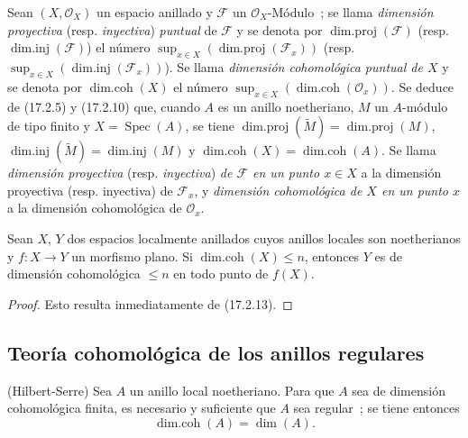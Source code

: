 \begin{env}[17.2.14]
\label{0.17.2.14-fr}
Sean $(X,\mathscr{O}_X)$ un espacio anillado y $\mathscr{F}$ un
$\mathscr{O}_X$-Módulo~; se llama \emph{dimensión proyectiva} (resp.
\emph{inyectiva}) \emph{puntual} de $\mathscr{F}$ y se denota por
$\operatorname{dim.proj}(\mathscr{F})$ (resp.
$\operatorname{dim.inj}(\mathscr{F})$) el número
$\sup_{x\in X}(\operatorname{dim.proj}(\mathscr{F}_x))$ (resp.
$\sup_{x\in X}(\operatorname{dim.inj}(\mathscr{F}_x))$). Se llama
\emph{dimensión cohomológica puntual de $X$} y se denota por
$\operatorname{dim.coh}(X)$ el número
$\sup_{x\in X}(\operatorname{dim.coh}(\mathscr{O}_x))$. Se deduce de
(17.2.5) y (17.2.10) que, cuando $A$ es un anillo noetheriano, $M$ un
$A$-módulo de tipo finito y $X=\operatorname{Spec}(A)$, se tiene
$\operatorname{dim.proj}(\widetilde{M})=\operatorname{dim.proj}(M)$,
$\operatorname{dim.inj}(\widetilde{M})=\operatorname{dim.inj}(M)$ y
$\operatorname{dim.coh}(X)=\operatorname{dim.coh}(A)$. Se llama
\emph{dimensión proyectiva} (resp. \emph{inyectiva}) \emph{de $\mathscr{F}$ en
un punto $x\in X$} a la dimensión proyectiva (resp. inyectiva) de
$\mathscr{F}_x$, y \emph{dimensión cohomológica de $X$ en un punto $x$} a la
dimensión cohomológica de $\mathscr{O}_x$.
\end{env}

\begin{proposition}[17.2.15]
\label{0.17.2.15-fr}
Sean $X$, $Y$ dos espacios localmente anillados cuyos anillos locales son noetherianos y
$f:X\longrightarrow Y$ un morfismo plano. Si
$\operatorname{dim.coh}(X)\leq n$, entonces $Y$ es de dimensión cohomológica
$\leq n$ en todo punto de $f(X)$.
\end{proposition}

\begin{proof}
Esto resulta inmediatamente de (17.2.13).
\end{proof}

\subsection{Teoría cohomológica de los anillos regulares}
\label{subsection:0.17.3-fr}

\begin{theorem}[17.3.1]
\label{0.17.3.1-fr}
\textnormal{(Hilbert-Serre)} Sea $A$ un anillo local noetheriano. Para que $A$
sea de dimensión cohomológica finita, es necesario y suficiente que $A$ sea
regular~; se tiene entonces
\begin{equation}
\label{0.17.3.1.1-fr}
\tag{17.3.1.1}
  \operatorname{dim.coh}(A)=\dim(A).
\end{equation}
\end{theorem}

